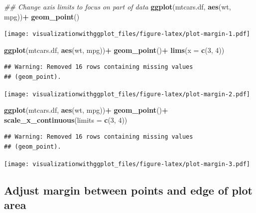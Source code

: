 \documentclass[]{krantz}
\makeatletter
\newenvironment{Shaded}{\begin{snugshade}}{\end{snugshade}}
\newcommand{\CommentTok}[1]{\textcolor[rgb]{0.56,0.35,0.01}{\textit{#1}}}
\newcommand{\DataTypeTok}[1]{\textcolor[rgb]{0.13,0.29,0.53}{#1}}
\newcommand{\DecValTok}[1]{\textcolor[rgb]{0.00,0.00,0.81}{#1}}
\newcommand{\KeywordTok}[1]{\textcolor[rgb]{0.13,0.29,0.53}{\textbf{#1}}}
\newcommand{\NormalTok}[1]{#1}
\newcommand{\OperatorTok}[1]{\textcolor[rgb]{0.81,0.36,0.00}{\textbf{#1}}}
\newcommand{\StringTok}[1]{\textcolor[rgb]{0.31,0.60,0.02}{#1}}
\newenvironment{kframe}{%
\medskip{}
\setlength{\fboxsep}{.8em}
 \def\at@end@of@kframe{}%
 \ifinner\ifhmode%
  \def\at@end@of@kframe{\end{minipage}}%
  \begin{minipage}{\columnwidth}%
 \fi\fi%
 \def\FrameCommand##1{\hskip\@totalleftmargin \hskip-\fboxsep
 \colorbox{shadecolor}{##1}\hskip-\fboxsep
     \hskip-\linewidth \hskip-\@totalleftmargin \hskip\columnwidth}%
 \MakeFramed {\advance\hsize-\width
   \@totalleftmargin\z@ \linewidth\hsize
   \@setminipage}}%
 {\par\unskip\endMakeFramed%
 \at@end@of@kframe}
\renewenvironment{Shaded}{\begin{kframe}}{\end{kframe}}
\makeatother
\begin{document}
\begin{Shaded}
\begin{Highlighting}[]
\CommentTok{## Change axis limits to focus on part of data}
\KeywordTok{ggplot}\NormalTok{(mtcars.df, }\KeywordTok{aes}\NormalTok{(wt, mpg))}\OperatorTok{+}
\StringTok{  }\KeywordTok{geom_point}\NormalTok{()}
\end{Highlighting}
\end{Shaded}

\texttt{[image: visualizationwithggplot\_files/figure-latex/plot-margin-1.pdf]}

\begin{Shaded}
\begin{Highlighting}[]
\KeywordTok{ggplot}\NormalTok{(mtcars.df, }\KeywordTok{aes}\NormalTok{(wt, mpg))}\OperatorTok{+}
\KeywordTok{geom_point}\NormalTok{()}\OperatorTok{+}
\KeywordTok{lims}\NormalTok{(}\DataTypeTok{x =} \KeywordTok{c}\NormalTok{(}\DecValTok{3}\NormalTok{, }\DecValTok{4}\NormalTok{))}
\end{Highlighting}
\end{Shaded}

\begin{verbatim}
## Warning: Removed 16 rows containing missing values
## (geom_point).
\end{verbatim}

\texttt{[image: visualizationwithggplot\_files/figure-latex/plot-margin-2.pdf]}

\begin{Shaded}
\begin{Highlighting}[]
\KeywordTok{ggplot}\NormalTok{(mtcars.df, }\KeywordTok{aes}\NormalTok{(wt, mpg))}\OperatorTok{+}
\KeywordTok{geom_point}\NormalTok{()}\OperatorTok{+}
\KeywordTok{scale_x_continuous}\NormalTok{(}\DataTypeTok{limits =} \KeywordTok{c}\NormalTok{(}\DecValTok{3}\NormalTok{, }\DecValTok{4}\NormalTok{))}
\end{Highlighting}
\end{Shaded}

\begin{verbatim}
## Warning: Removed 16 rows containing missing values
## (geom_point).
\end{verbatim}

\texttt{[image: visualizationwithggplot\_files/figure-latex/plot-margin-3.pdf]}

\hypertarget{adjust-margin-between-points-and-edge-of-plot-area}{%
\subsection{Adjust margin between points and edge of plot area}\label{adjust-margin-between-points-and-edge-of-plot-area}}
\end{document}
